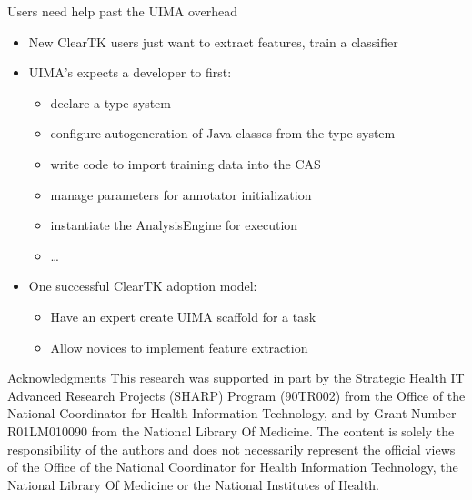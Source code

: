 \documentclass[final]{beamer}
\begin{document}
\begin{frame}[fragile]
\begin{columns}[t]
\begin{column}{.45\linewidth}
\begin{block}{Users need help past the UIMA overhead}
            \begin{itemize}
                    \item New ClearTK users just want to extract features, train a classifier
                    \bigskip
                    \item UIMA's expects a developer to first:
                            \begin{itemize}
                                    \item declare a type system
                                    \item configure autogeneration of Java classes from the type system
                                    \item write code to import training data into the CAS
                                    \item manage parameters for annotator initialization
                                    \item instantiate the AnalysisEngine for execution
                                    \item \ldots
                            \end{itemize}
                    \bigskip
                    \item One successful ClearTK adoption model:
                            \begin{itemize}
                                    \item Have an expert create UIMA scaffold for a task
                                    \item Allow novices to implement feature extraction
                            \end{itemize}

            \end{itemize}
    \end{block}

    \begin{block}{Acknowledgments}
            \footnotesize
            This research was supported in part by the Strategic Health IT Advanced Research Projects (SHARP) Program (90TR002) from the Office of the National Coordinator for Health Information Technology, and by Grant Number R01LM010090 from the National Library Of Medicine. The content is solely the responsibility of the authors and does not necessarily represent the official views of the Office of the National Coordinator for Health Information Technology, the National Library Of Medicine or the National Institutes of Health.
    \end{block}
    
  \end{column}

\end{columns}
\vfill
\end{frame}
\end{document}
